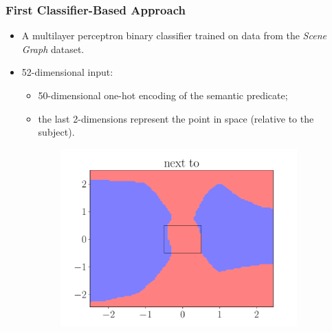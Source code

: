 \documentclass{beamer}
\begin{document}
\begin{frame}
\begin{figure}[ht]
\begin{subfigure}{0.45\textwidth}
        \end{subfigure}
    \end{figure}
\end{frame}

\begin{frame}
    \frametitle{First Classifier-Based Approach}
    \begin{itemize}
        \item A multilayer perceptron binary classifier trained on data from the \emph{Scene Graph} dataset.
        \item 52-dimensional input:
        \begin{itemize}
            \item 50-dimensional one-hot encoding of the semantic predicate;
            \item the last 2-dimensions represent the point in space (relative to the subject).
        \end{itemize}
    \end{itemize}
    \begin{figure}[ht]
        \centering
        \begin{subfigure}{0.45\textwidth}
            \centering
            \includegraphics[width=\textwidth]{figures/next_to_predicate_only}
        \end{subfigure}
        \begin{subfigure}{0.45\textwidth}
            \centering

\end{subfigure}
\end{figure}
\end{frame}
\end{document}
